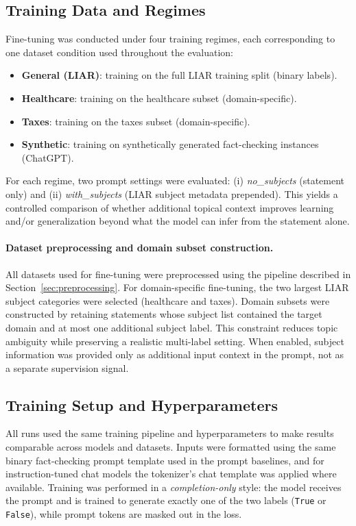\subsection{Training Data and Regimes}

Fine-tuning was conducted under four training regimes, each corresponding to one dataset condition used throughout the evaluation:

\begin{itemize}
    \item \textbf{General (LIAR)}: training on the full LIAR training split (binary labels).
    \item \textbf{Healthcare}: training on the healthcare subset (domain-specific).
    \item \textbf{Taxes}: training on the taxes subset (domain-specific).
    \item \textbf{Synthetic}: training on synthetically generated fact-checking instances (ChatGPT).
\end{itemize}

For each regime, two prompt settings were evaluated:
(i) \emph{no\_subjects} (statement only) and
(ii) \emph{with\_subjects} (LIAR subject metadata prepended).
This yields a controlled comparison of whether additional topical context improves learning and/or generalization beyond what the model can infer from the statement alone.

\paragraph{Dataset preprocessing and domain subset construction.}
All datasets used for fine-tuning were preprocessed using the pipeline described in Section~\ref{sec:preprocessing}. 
For domain-specific fine-tuning, the two largest LIAR subject categories were selected (healthcare and taxes). 
Domain subsets were constructed by retaining statements whose subject list contained the target domain and at most one additional subject label. 
This constraint reduces topic ambiguity while preserving a realistic multi-label setting. 
When enabled, subject information was provided only as additional input context in the prompt, not as a separate supervision signal.

\subsection{Training Setup and Hyperparameters}

All runs used the same training pipeline and hyperparameters to make results comparable across models and datasets. Inputs were formatted using the same binary fact-checking prompt template used in the prompt baselines, and for instruction-tuned chat models the tokenizer's chat template was applied where available. Training was performed in a \emph{completion-only} style: the model receives the prompt and is trained to generate exactly one of the two labels (\texttt{True} or \texttt{False}), while prompt tokens are masked out in the loss.

